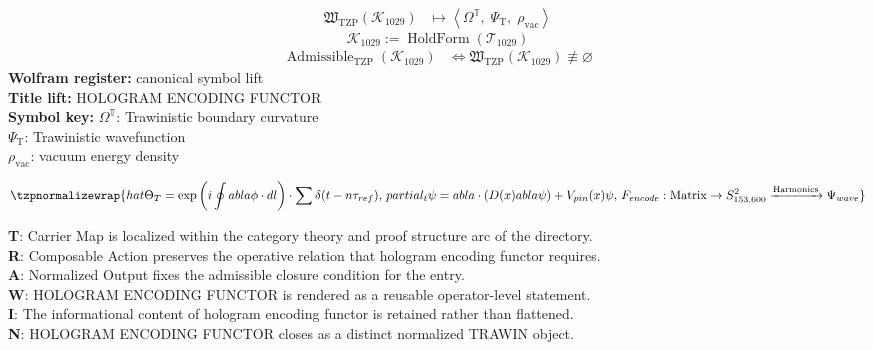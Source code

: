 \noindent
\begin{minipage}[t]{0.48\linewidth}
\begingroup
\small
\[
\begin{aligned}
\mathfrak{W}_{\mathrm{TZP}}\!\left(\mathcal{K}_{1029}\right)
&\longmapsto
\left\langle \Omega^{\mathbb{T}},\; \Psi_{\mathrm{T}},\; \rho_{\mathrm{vac}} \right\rangle
\end{aligned}
\]
\[
\mathcal{K}_{1029}
:=
\operatorname{HoldForm}\!\left(\mathcal{T}_{1029}\right)
\]
\[
\begin{aligned}
\operatorname{Admissible}_{\mathrm{TZP}}\!\left(\mathcal{K}_{1029}\right)
&\Longleftrightarrow
\mathfrak{W}_{\mathrm{TZP}}\!\left(\mathcal{K}_{1029}\right)\not\equiv\varnothing
\end{aligned}
\]
\textbf{Wolfram register:} canonical symbol lift\\
\textbf{Title lift:} HOLOGRAM ENCODING FUNCTOR\\
\textbf{Symbol key:} \(\Omega^{\mathbb{T}}\): Trawinistic boundary curvature\\ \(\Psi_{\mathrm{T}}\): Trawinistic wavefunction\\ \(\rho_{\mathrm{vac}}\): vacuum energy density
\par
\endgroup
\end{minipage}\hfill
\begin{minipage}[t]{0.48\linewidth}
\[
\tzpnormalizewrap{hat{\Theta}_T = \exp\left( i \oint  abla \phi \cdot dl \right) \cdot \sum \delta(t - n\tau_{ref}),\,partial_t \psi =  abla \cdot (D(x)  abla \psi) + V_{pin}(x) \psi,\,F_{encode}: \text{Matrix} \to S^2_{153,600} \xrightarrow{\text{Harmonics}} \Psi_{wave}}
\]

\small
\textbf{T}: Carrier Map is localized within the category theory and proof structure arc of the directory.\\
\textbf{R}: Composable Action preserves the operative relation that hologram encoding functor requires.\\
\textbf{A}: Normalized Output fixes the admissible closure condition for the entry.\\
\textbf{W}: HOLOGRAM ENCODING FUNCTOR is rendered as a reusable operator-level statement.\\
\textbf{I}: The informational content of hologram encoding functor is retained rather than flattened.\\
\textbf{N}: HOLOGRAM ENCODING FUNCTOR closes as a distinct normalized TRAWIN object.
\normalsize
\end{minipage}


